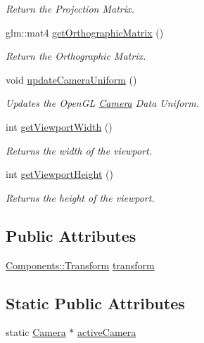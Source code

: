 \begin{DoxyCompactItemize}
\begin{DoxyCompactList}\small\item\em Return the Projection Matrix. \end{DoxyCompactList}\item 
glm\+::mat4 \hyperlink{class_cookie_eng_1_1_object_1_1_camera_a97d3643a31849d86ad74137417d229df}{get\+Orthographic\+Matrix} ()
\begin{DoxyCompactList}\small\item\em Return the Orthographic Matrix. \end{DoxyCompactList}\item 
void \hyperlink{class_cookie_eng_1_1_object_1_1_camera_a0b8a35f92490adf193d36f2906a2c1d8}{update\+Camera\+Uniform} ()
\begin{DoxyCompactList}\small\item\em Updates the Open\+GL \hyperlink{class_cookie_eng_1_1_object_1_1_camera}{Camera} Data Uniform. \end{DoxyCompactList}\item 
int \hyperlink{class_cookie_eng_1_1_object_1_1_camera_ae21ba7bbc237d0ddfac4d9531ba4597e}{get\+Viewport\+Width} ()
\begin{DoxyCompactList}\small\item\em Returns the width of the viewport. \end{DoxyCompactList}\item 
int \hyperlink{class_cookie_eng_1_1_object_1_1_camera_ad3cd942d665b97a64e19b68b5d0fe6fb}{get\+Viewport\+Height} ()
\begin{DoxyCompactList}\small\item\em Returns the height of the viewport. \end{DoxyCompactList}\end{DoxyCompactItemize}
\subsection*{Public Attributes}
\begin{DoxyCompactItemize}
\item 
\hyperlink{class_cookie_eng_1_1_components_1_1_transform}{Components\+::\+Transform} \hyperlink{class_cookie_eng_1_1_object_1_1_camera_aa996e685c79a71bd30e88341b68ed197}{transform}
\end{DoxyCompactItemize}
\subsection*{Static Public Attributes}
\begin{DoxyCompactItemize}
\item 
static \hyperlink{class_cookie_eng_1_1_object_1_1_camera}{Camera} $\ast$ \hyperlink{class_cookie_eng_1_1_object_1_1_camera_a552d79d05b0478c0ce92aa1d673ea1a7}{active\+Camera}
\end{DoxyCompactItemize}
